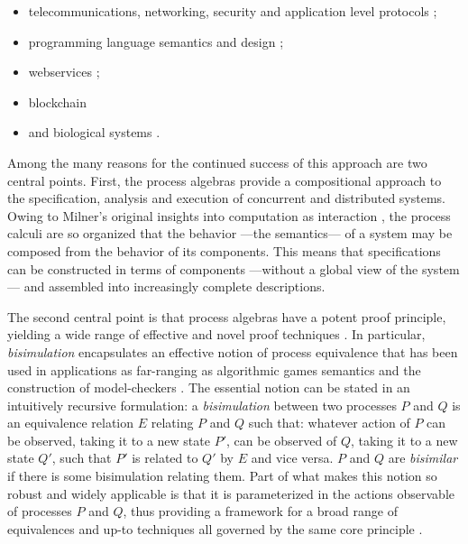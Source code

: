 \begin{itemize}
\item telecommunications, networking, security and application level protocols
\cite{DBLP:conf/popl/AbadiB02} 
\cite{DBLP:journals/tcs/AbadiB03} 
\cite{DBLP:conf/epew/BrownLM05} 
\cite{DBLP:conf/fossacs/LaneveZ05}; 
\item programming language semantics and design
\cite{DBLP:conf/epew/BrownLM05}
\cite{djoin}
\cite{DBLP:conf/afp/FournetFMS02}
\cite{DBLP:journals/toplas/SewellWU10};
\item webservices
\cite{DBLP:conf/epew/BrownLM05}
\cite{DBLP:conf/fossacs/LaneveZ05}
\cite{DBLP:conf/wise/Meredith03};
\item{blockchain}
  \cite{meredith_2017}
\item and biological systems
\cite{DBLP:conf/cmsb/Cardelli04}
\cite{DBLP:conf/esop/DanosL03}
\cite{DBLP:conf/psb/RegevSS01}
\cite{DBLP:journals/ipl/PriamiRSS01}.
\end{itemize}

Among the many reasons for the continued success of this approach are
two central points. First, the process algebras provide a
compositional approach to the specification, analysis and execution of
concurrent and distributed systems. Owing to Milner's original
insights into computation as interaction
\cite{DBLP:journals/cacm/Milner93}, the process calculi are so
organized that the behavior ---the semantics--- of a system may be
composed from the behavior of its components. This means that
specifications can be constructed in terms of components ---without a
global view of the system--- and assembled into increasingly complete
descriptions.

The second central point is that process algebras have a potent proof
principle, yielding a wide range of effective and novel proof
techniques \cite{DBLP:conf/concur/SangiorgiM92}
\cite{DBLP:conf/fmco/Sangiorgi05}
\cite{DBLP:journals/toplas/Sangiorgi09}. In particular,
\emph{bisimulation} encapsulates an effective notion of process
equivalence that has been used in applications as far-ranging as
algorithmic games semantics \cite{DBLP:conf/sas/Abramsky05} and the
construction of model-checkers \cite{caires_2004}. The essential
notion can be stated in an intuitively recursive formulation: a
\emph{bisimulation} between two processes $P$ and $Q$ is an
equivalence relation $E$ relating $P$ and $Q$ such that: whatever
action of $P$ can be observed, taking it to a new state $P'$, can be
observed of $Q$, taking it to a new state $Q'$, such that $P'$ is
related to $Q'$ by $E$ and vice versa. $P$ and $Q$ are
\emph{bisimilar} if there is some bisimulation relating them. Part of
what makes this notion so robust and widely applicable is that it is
parameterized in the actions observable of processes $P$ and $Q$, thus
providing a framework for a broad range of equivalences and up-to
techniques \cite{DBLP:conf/concur/SangiorgiM92} all governed by the
same core principle \cite{DBLP:journals/toplas/Sangiorgi09}.
